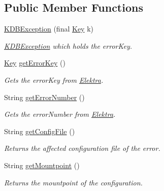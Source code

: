 \subsection*{Public Member Functions}
\begin{DoxyCompactItemize}
\item 
\mbox{\hyperlink{classorg_1_1libelektra_1_1exception_1_1KDBException_a872741690ba68b12b14edc32e4675eef}{K\+D\+B\+Exception}} (final \mbox{\hyperlink{classorg_1_1libelektra_1_1Key}{Key}} k)
\begin{DoxyCompactList}\small\item\em \mbox{\hyperlink{classorg_1_1libelektra_1_1exception_1_1KDBException}{K\+D\+B\+Exception}} which holds the error\+Key. \end{DoxyCompactList}\item 
\mbox{\hyperlink{classorg_1_1libelektra_1_1Key}{Key}} \mbox{\hyperlink{classorg_1_1libelektra_1_1exception_1_1KDBException_a8fd8c0decfe1f1f6243407614d042101}{get\+Error\+Key}} ()
\begin{DoxyCompactList}\small\item\em Gets the error\+Key from \mbox{\hyperlink{interfaceorg_1_1libelektra_1_1Elektra}{Elektra}}. \end{DoxyCompactList}\item 
String \mbox{\hyperlink{classorg_1_1libelektra_1_1exception_1_1KDBException_a3d07f27121a4870471ea6927d93c04a9}{get\+Error\+Number}} ()
\begin{DoxyCompactList}\small\item\em Gets the error\+Number from \mbox{\hyperlink{interfaceorg_1_1libelektra_1_1Elektra}{Elektra}}. \end{DoxyCompactList}\item 
String \mbox{\hyperlink{classorg_1_1libelektra_1_1exception_1_1KDBException_ad963bf071d65028200f13f18bc355472}{get\+Config\+File}} ()
\begin{DoxyCompactList}\small\item\em Returns the affected configuration file of the error. \end{DoxyCompactList}\item 
String \mbox{\hyperlink{classorg_1_1libelektra_1_1exception_1_1KDBException_a7595349ac675e5b57616020d512b82d2}{get\+Mountpoint}} ()
\begin{DoxyCompactList}\small\item\em Returns the mountpoint of the configuration. \end{DoxyCompactList}\item 

\end{DoxyCompactItemize}
